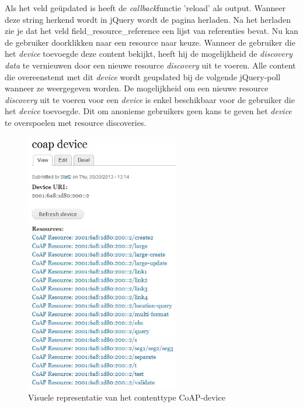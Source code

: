 Als het veld ge\"{u}pdated is heeft de \textit{callback}functie 'reload' als output. Wanneer deze string herkend wordt in jQuery wordt de pagina herladen. Na het herladen zie je dat het veld field\_resource\_reference een lijst van referenties bevat. Nu kan de gebruiker doorklikken naar een resource naar keuze. Wanneer de gebruiker die het \textit{device} toevoegde deze content bekijkt, heeft hij de mogelijkheid de \textit{discovery data} te vernieuwen door een nieuwe resource \textit{discovery} uit te voeren. Alle content die overeenstemt met dit \textit{device} wordt geupdated bij de volgende jQuery-poll wanneer ze weergegeven worden. De mogelijkheid om een nieuwe resource \textit{discovery} uit te voeren voor een \textit{device} is enkel beschikbaar voor de gebruiker die het \textit{device} toevoegde. Dit om anonieme gebruikers geen kans te geven het \textit{device} te overspoelen met resource discoveries.
\begin{figure}[h!]
\centering
\includegraphics[width=0.6\textwidth]{fig/coap_device}
\caption{Visuele representatie van het contenttype CoAP-device}
\label{fig:coapDevice}
\end{figure}


